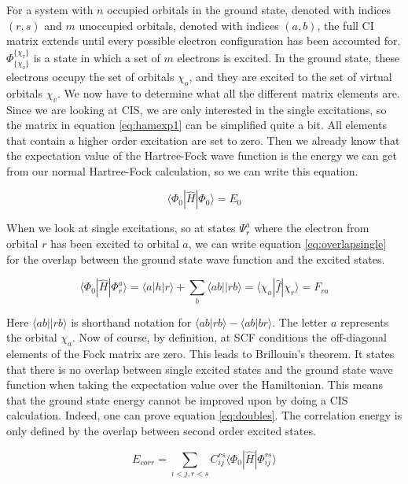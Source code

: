 \documentclass[twoside,twocolumn,9pt]{article}
\begin{document}
For a system with $n$ occupied orbitals in the ground state, denoted with indices $(r, s)$ and $m$ unoccupied orbitals, denoted with indices $(a,b)$, the full CI matrix extends until
every possible electron configuration has been accounted for. $\Phi_{\{\chi_o\}}^{\{\chi_v\}}$ is a state in which a set of $m$ electrons is excited. In the ground state, these
electrons occupy the set of orbitals {$\chi_o$}, and they are excited to the set of virtual orbitals {$\chi_v$}.
We now have to determine what all the different matrix elements are. Since we are looking at CIS, we are only interested in the single excitations, so the matrix in equation
\eqref{eq:hamexp1} can be simplified quite a bit. All elements that contain a higher order excitation are set to zero. Then we already know that the expectation value of the Hartree-Fock wave function is the energy we can get from our normal
Hartree-Fock calculation, so we can write this equation.

\begin{equation}\label{eq:E0}
  \langle \Phi_0 | \hat{H} | \Phi_0 \rangle = E_0
\end{equation}

When we look at single excitations, so at states $\Psi_r^a$ where the electron from orbital $r$ has been excited to orbital $a$, we can write equation
\eqref{eq:overlapsingle}\cite{Szabo1996} for the overlap between the ground state wave function and the excited states.

\begin{equation}\label{eq:overlapsingle}
  \langle\Phi_0 |\hat{H}|\Phi_r^a\rangle = \langle a|h|r \rangle + \sum_b \langle ab||rb \rangle = \langle \chi_a |\hat{f}| \chi_r \rangle = F_{ra}
\end{equation}

Here $\langle ab||rb \rangle$ is shorthand notation for $\langle ab | rb \rangle - \langle ab | br \rangle$. The letter $a$ represents the orbital $\chi_a$.
Now of course, by definition, at SCF conditions the off-diagonal elements of the Fock matrix are zero. This leads to Brillouin's theorem. It states that there is no overlap
between single excited states and the ground state wave function when taking the expectation value over the Hamiltonian. This means that the ground state energy cannot be improved
upon by doing a CIS calculation. Indeed, one can prove equation \eqref{eq:doubles}\cite{Szabo1996}. The correlation energy is only defined by the overlap between second order
excited states.

\begin{equation}\label{eq:doubles}
  E_{corr} = \sum_{i<j, r<s} C_{ij}^{rs}\langle \Phi_{0} |\hat{H}|\Phi_{ij}^{rs}\rangle
\end{equation}
\end{document}
